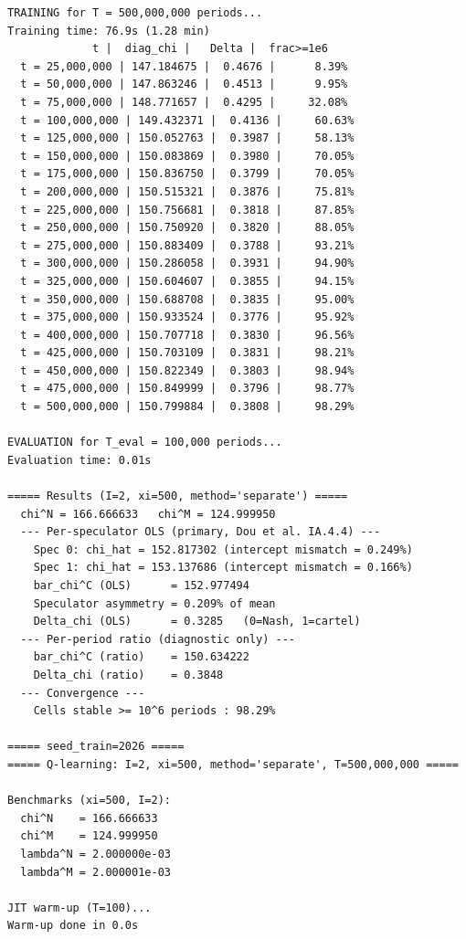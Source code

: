 \begin{lstlisting}[style=outputstyle]
TRAINING for T = 500,000,000 periods...
Training time: 76.9s (1.28 min)
             t |  diag_chi |   Delta |  frac>=1e6
  t = 25,000,000 | 147.184675 |  0.4676 |      8.39%
  t = 50,000,000 | 147.863246 |  0.4513 |      9.95%
  t = 75,000,000 | 148.771657 |  0.4295 |     32.08%
  t = 100,000,000 | 149.432371 |  0.4136 |     60.63%
  t = 125,000,000 | 150.052763 |  0.3987 |     58.13%
  t = 150,000,000 | 150.083869 |  0.3980 |     70.05%
  t = 175,000,000 | 150.836750 |  0.3799 |     70.05%
  t = 200,000,000 | 150.515321 |  0.3876 |     75.81%
  t = 225,000,000 | 150.756681 |  0.3818 |     87.85%
  t = 250,000,000 | 150.750920 |  0.3820 |     88.05%
  t = 275,000,000 | 150.883409 |  0.3788 |     93.21%
  t = 300,000,000 | 150.286058 |  0.3931 |     94.90%
  t = 325,000,000 | 150.604607 |  0.3855 |     94.15%
  t = 350,000,000 | 150.688708 |  0.3835 |     95.00%
  t = 375,000,000 | 150.933524 |  0.3776 |     95.92%
  t = 400,000,000 | 150.707718 |  0.3830 |     96.56%
  t = 425,000,000 | 150.703109 |  0.3831 |     98.21%
  t = 450,000,000 | 150.822349 |  0.3803 |     98.94%
  t = 475,000,000 | 150.849999 |  0.3796 |     98.77%
  t = 500,000,000 | 150.799884 |  0.3808 |     98.29%

EVALUATION for T_eval = 100,000 periods...
Evaluation time: 0.01s

===== Results (I=2, xi=500, method='separate') =====
  chi^N = 166.666633   chi^M = 124.999950
  --- Per-speculator OLS (primary, Dou et al. IA.4.4) ---
    Spec 0: chi_hat = 152.817302 (intercept mismatch = 0.249%)
    Spec 1: chi_hat = 153.137686 (intercept mismatch = 0.166%)
    bar_chi^C (OLS)      = 152.977494
    Speculator asymmetry = 0.209% of mean
    Delta_chi (OLS)      = 0.3285   (0=Nash, 1=cartel)
  --- Per-period ratio (diagnostic only) ---
    bar_chi^C (ratio)    = 150.634222
    Delta_chi (ratio)    = 0.3848
  --- Convergence ---
    Cells stable >= 10^6 periods : 98.29%

===== seed_train=2026 =====
===== Q-learning: I=2, xi=500, method='separate', T=500,000,000 =====

Benchmarks (xi=500, I=2):
  chi^N    = 166.666633
  chi^M    = 124.999950
  lambda^N = 2.000000e-03
  lambda^M = 2.000001e-03

JIT warm-up (T=100)...
Warm-up done in 0.0s


\end{lstlisting}
